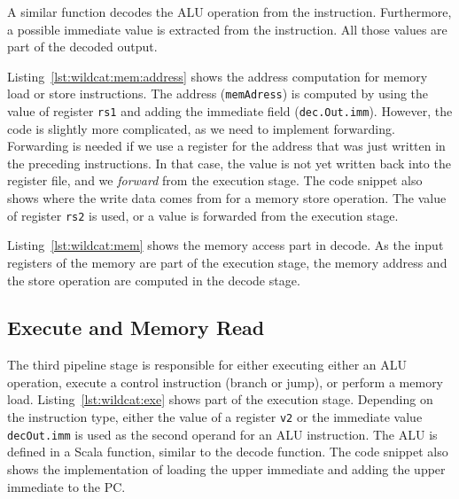\documentclass[%
    10pt,
    headinclude, footexclude,
    openright, %
    notitlepage,
    cleardoubleempty,
    headsepline,
    pointlessnumbers,
    bibtotoc, idxtotoc,
    ]{scrbook}
\newcommand{\code}[1]{{\lstinline[basicstyle=\small\ttfamily]{#1}}}
\begin{document}

A similar function decodes the ALU operation from the instruction. Furthermore, a possible
immediate value is extracted from the instruction. All those values are part of the
decoded output.

Listing~\ref{lst:wildcat:mem:address} shows the address computation for memory
load or store instructions. The address (\code{memAdress}) is computed by using the value of
register \code{rs1} and adding the immediate field (\code{dec.Out.imm}).
However, the code is slightly more complicated, as we need to implement forwarding.
Forwarding is needed if we use a register for the address that was just written in
the preceding instructions. In that case, the value is not yet written back into the register
file, and we \emph{forward} from the execution stage.
The code snippet also shows where the write data comes from for a memory store operation.
The value of register \code{rs2} is used, or a value is forwarded from the execution
stage.


Listing~\ref{lst:wildcat:mem} shows the memory access part in decode.
As the input registers of the memory are part of the execution stage, the memory address
and the store operation are computed in the decode stage.



 
\subsection{Execute and Memory Read}

The third pipeline stage is responsible for either executing either an ALU operation, execute
a control instruction (branch or jump), or perform a memory load.
Listing~\ref{lst:wildcat:exe} shows part of the execution stage. Depending on the instruction
type, either the value of a register \code{v2} or the immediate value \code{decOut.imm}
is used as the second operand for an ALU instruction. The ALU is defined in a Scala function,
similar to the decode function. The code snippet also shows the implementation of loading the upper
immediate and adding the upper immediate to the PC.
\end{document}
